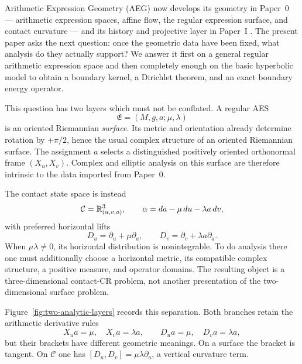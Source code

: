 Arithmetic Expression Geometry (AEG) now develops its geometry in Paper~0 ---
arithmetic expression spaces, affine flow, the regular expression surface, and
contact curvature \cite{Yuan2026AEGPaperZero} --- and its history and projective
layer in Paper~I \cite{Yuan2026AEGFoundations}.  The present paper asks the next
question: once the geometric data have been fixed, what analysis do they actually
support?  We answer it
first on a general regular arithmetic expression space and then completely enough on
the basic hyperbolic model to obtain a boundary kernel, a Dirichlet theorem, and an
exact boundary energy operator.

This question has two layers which must not be conflated.  A regular AES
\[
  \mathfrak E=(M,g,a;\mu,\lambda)
\]
is an oriented Riemannian \emph{surface}.  Its metric and orientation already
determine rotation by $+\pi/2$, hence the usual complex structure of an oriented
Riemannian surface.  The assignment $a$ selects a distinguished positively oriented
orthonormal frame $(X_u,X_v)$.  Complex and elliptic analysis on this surface are
therefore intrinsic to the data imported from Paper~0.

The contact state space is instead
\[
 \mathcal C=\mathbb{R}^3_{(u,v,a)},\qquad
 \alpha=da-\mu\,du-\lambda a\,dv,
\]
with preferred horizontal lifts
\[
 D_u=\partial_u+\mu\partial_a,
 \qquad
 D_v=\partial_v+\lambda a\partial_a.
\]
When $\mu\lambda\ne0$, its horizontal distribution is nonintegrable.  To do
analysis there one must additionally choose a horizontal metric, its compatible
complex structure, a positive measure, and operator domains.  The resulting object
is a three-dimensional contact-CR problem, not another presentation of the
two-dimensional surface problem.

Figure~\ref{fig:two-analytic-layers} records this separation.  Both branches retain
the arithmetic derivative rules
\[
 X_ua=\mu,\quad X_va=\lambda a,
 \qquad
 D_ua=\mu,\quad D_va=\lambda a,
\]
but their brackets have different geometric meanings.  On a surface the bracket is
tangent.  On $\mathcal C$ one has
$[D_u,D_v]=\mu\lambda\partial_a$, a vertical curvature term.

